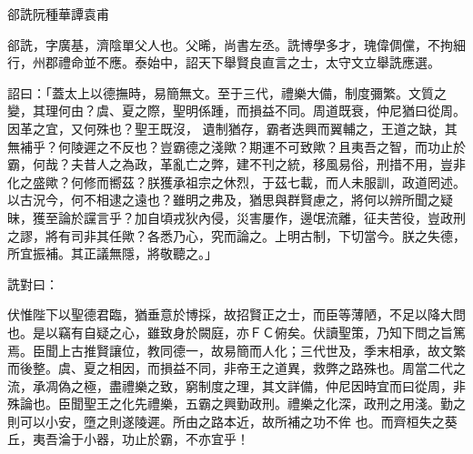 
\begin{pinyinscope}

 郤詵阮種華譚袁甫



 郤詵，字廣基，濟陰單父人也。父晞，尚書左丞。詵博學多才，瑰偉倜儻，不拘細行，州郡禮命並不應。泰始中，詔天下舉賢良直言之士，太守文立舉詵應選。



 詔曰：「蓋太上以德撫時，易簡無文。至于三代，禮樂大備，制度彌繁。文質之變，其理何由？虞、夏之際，聖明係踵，而損益不同。周道既衰，仲尼猶曰從周。因革之宜，又何殊也？聖王既沒，
 遺制猶存，霸者迭興而翼輔之，王道之缺，其無補乎？何陵遲之不反也？豈霸德之淺歟？期運不可致歟？且夷吾之智，而功止於霸，何哉？夫昔人之為政，革亂亡之弊，建不刊之統，移風易俗，刑措不用，豈非化之盛歟？何修而嚮茲？朕獲承祖宗之休烈，于茲七載，而人未服訓，政道罔述。以古況今，何不相逮之遠也？雖明之弗及，猶思與群賢慮之，將何以辨所聞之疑昧，獲至論於讜言乎？加自頃戎狄內侵，災害屢作，邊氓流離，征夫苦役，豈政刑之謬，將有司非其任歟？各悉乃心，究而論之。上明古制，下切當今。朕之失德，所宜振補。其正議無隱，將敬聽之。」



 詵對曰：



 伏惟陛下以聖德君臨，猶垂意於博採，故招賢正之士，而臣等薄陋，不足以降大問也。是以竊有自疑之心，雖致身於闕庭，亦ＦＣ俯矣。伏讀聖策，乃知下問之旨篤焉。臣聞上古推賢讓位，教同德一，故易簡而人化；三代世及，季末相承，故文繁而後整。虞、夏之相因，而損益不同，非帝王之道異，救弊之路殊也。周當二代之流，承凋偽之極，盡禮樂之致，窮制度之理，其文詳備，仲尼因時宜而曰從周，非殊論也。臣聞聖王之化先禮樂，五霸之興勤政刑。禮樂之化深，政刑之用淺。勤之則可以小安，墮之則遂陵遲。所由之路本近，故所補之功不侔
 也。而齊桓失之葵丘，夷吾淪于小器，功止於霸，不亦宜乎！




\end{pinyinscope}
